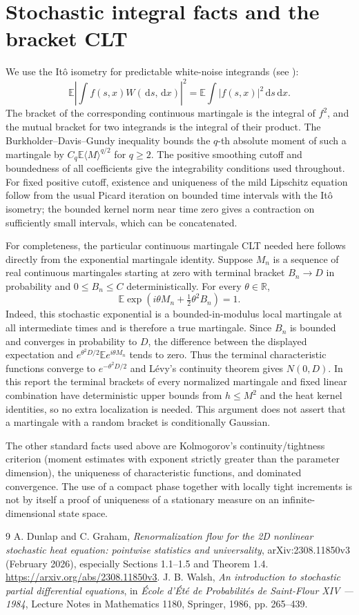 \documentclass[11pt]{article}
\numberwithin{equation}{section}
\theoremstyle{definition}
\theoremstyle{remark}
\newcommand{\R}{\mathbb R}
\newcommand{\E}{\mathbb E}
\newcommand{\dd}{\,\mathrm d}
\begin{document}
\section{Stochastic integral facts and the bracket CLT}\label{app:mart}
We use the It\^o isometry for predictable white-noise integrands (see \cite{Walsh}):
\[
 \E\left|\int f(s,x)W(\dd s,\dd x)\right|^2=\E\int |f(s,x)|^2\dd s\dd x.
\]
The bracket of the corresponding continuous martingale is the integral of $f^2$, and the mutual bracket for two integrands is the integral of their product. The Burkholder--Davis--Gundy inequality bounds the $q$-th absolute moment of such a martingale by $C_q\E\langle M\rangle^{q/2}$ for $q\ge2$. The positive smoothing cutoff and boundedness of all coefficients give the integrability conditions used throughout. For fixed positive cutoff, existence and uniqueness of the mild Lipschitz equation follow from the usual Picard iteration on bounded time intervals with the It\^o isometry; the bounded kernel norm near time zero gives a contraction on sufficiently small intervals, which can be concatenated.

For completeness, the particular continuous martingale CLT needed here follows directly from the exponential martingale identity. Suppose $M_n$ is a sequence of real continuous martingales starting at zero with terminal bracket $B_n\to D$ in probability and $0\le B_n\le C$ deterministically. For every $\theta\in\R$,
\[
 \E\exp(i\theta M_n+\tfrac12\theta^2B_n)=1.
\]
Indeed, this stochastic exponential is a bounded-in-modulus local martingale at all intermediate times and is therefore a true martingale. Since $B_n$ is bounded and converges in probability to $D$, the difference between the displayed expectation and $e^{\theta^2 D/2}\E e^{i\theta M_n}$ tends to zero. Thus the terminal characteristic functions converge to $e^{-\theta^2D/2}$ and L\'evy's continuity theorem gives $N(0,D)$. In this report the terminal brackets of every normalized martingale and fixed linear combination have deterministic upper bounds from $h\le M^2$ and the heat kernel identities, so no extra localization is needed. This argument does not assert that a martingale with a random bracket is conditionally Gaussian.

The other standard facts used above are Kolmogorov's continuity/tightness criterion (moment estimates with exponent strictly greater than the parameter dimension), the uniqueness of characteristic functions, and dominated convergence. The use of a compact phase together with locally tight increments is not by itself a proof of uniqueness of a stationary measure on an infinite-dimensional state space.

\begin{thebibliography}{9}
 A. Dunlap and C. Graham, \emph{Renormalization flow for the 2D nonlinear stochastic heat equation: pointwise statistics and universality}, arXiv:2308.11850v3 (February 2026), especially Sections 1.1--1.5 and Theorem 1.4. \url{https://arxiv.org/abs/2308.11850v3}.
 J. B. Walsh, \emph{An introduction to stochastic partial differential equations}, in \emph{\'Ecole d'\'Et\'e de Probabilit\'es de Saint-Flour XIV --- 1984}, Lecture Notes in Mathematics 1180, Springer, 1986, pp. 265--439.
\end{thebibliography}
\end{document}
